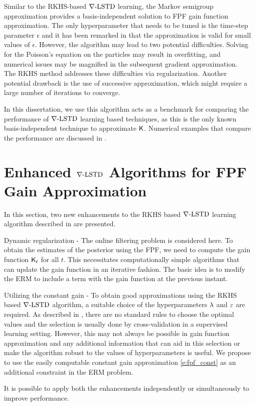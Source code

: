 Similar to the RKHS-based $\nabla\text{-LSTD}$ learning, the Markov semigroup approximation provides a basis-independent solution to FPF gain function approximation. The only hyperparameter that needs to be tuned is the time-step parameter $\epsilon$ and it has been remarked in \cite{tagmeh16} that the approximation is valid for small values of $\epsilon$. However, the algorithm may lead to two potential difficulties. Solving for the Poisson's equation on the particles may result in overfitting,  and numerical issues may be magnified in the subsequent gradient approximation. The RKHS method addresses these difficulties via regularization. Another potential drawback is the use of successive approximation, which might require a large number of iterations to converge. 

In this dissertation, we use this algorithm acts as a benchmark for comparing the performance of $\nabla\text{-LSTD}$ learning based techniques, as this is the only known basis-independent technique to approximate $\text{\sf K}$. Numerical examples that compare the performance are discussed in .


\section{Enhanced $\nabla\text{-LSTD}$ Algorithms for FPF Gain Approximation} 
\label{s:fpf_rkhs_improvements}
In this section, two new enhancements to the RKHS based $\nabla\text{-LSTD}$ learning algorithm described in  are presented. 
\begin{romannum}
\item Dynamic regularization - The online filtering problem is considered here. To obtain the estimates of the posterior using the FPF, we need to compute the gain function $\text{\sf K}_t$ for all $t$. This necessitates computationally simple algorithms that can update the gain function in an iterative fashion. The basic idea is to modify the ERM to include a term with the gain function at the previous instant.
\item Utilizing the constant gain - To obtain good approximations using the RKHS based $\nabla\text{-LSTD}$ algorithm, a suitable choice of the hyperparameters $\lambda$ and $\varepsilon$ are required. As described in , there are no standard rules to choose the optimal values and the selection is usually done by cross-validation in a supervised learning setting. However, this may not always be possible in gain function approximation and any additional information that can aid in this selection or make the algorithm robust to the values of hyperparameters is useful. We propose to use the easily computable constant gain approximation \eqref{e:fpf_const} as an additional constraint in the ERM problem. 
\end{romannum}
It is possible to apply both the enhancements independently or simultaneously to improve performance. 

